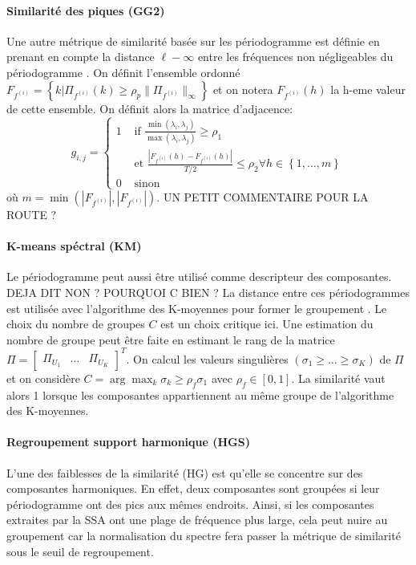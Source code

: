 \documentclass{gretsi}
\newcommand{\val}[3]{(#1_1 #3 \dots #3 #1_#2)}
\newcommand{\set}[1]{\left \{ 1, \dots, #1 \right \}}
\newcommand{\inter}{\left[0, 1\right]}
\begin{document}
\paragraph{Similarité des piques (GG2)}\label{par:GG2}
    Une autre métrique de similarité basée sur les périodogramme est définie en prenant en compte la distance $\ell-\infty$ entre les fréquences non négligeables du périodogramme \cite{abalov_14_auto}. On définit l'ensemble ordonné $F_{f^{(i)}} = \left \{ k | \Pi_{f^{(i)}}(k) \ge \rho_p \|\Pi_{f^{(i)}}\|_\infty \right \}$ et on notera $F_{f^{(i)}}(h)$ la h-eme valeur de cette ensemble. On définit alors la matrice d'adjacence:
    $$
    g_{i, j} = \begin{cases}
	    1 & \text{ if } \displaystyle\frac{\min(\lambda_i, \lambda_j)}{\max(\lambda_i, \lambda_j)} \ge \rho_1\\
	      & \text{ et } \frac{|F_{f^{(i)}}(h) - F_{f^{(i)}}(h)|}{T/2} \le \rho_2 \forall h \in \set{m}\\
	    0 & \text{ sinon}
    \end{cases}
    $$ où $m = \min\left(\left|F_{f^{(i)}}\right|, \left|F_{f^{(i)}}\right|\right)$.
UN PETIT COMMENTAIRE POUR LA ROUTE ?

\paragraph{K-means spéctral (KM)}\label{par:KM}
    Le périodogramme peut aussi être utilisé comme descripteur des composantes. DEJA DIT NON ? POURQUOI C BIEN ? La distance entre ces périodogrammes est utilisée avec l'algorithme des K-moyennes pour former le groupement \cite{alvarez_13_auto}. Le choix du nombre de groupes $C$ est un choix critique ici. Une estimation du nombre de groupe peut être faite en estimant le rang de la matrice $\Pi = \begin{bmatrix}\Pi_{U_1}&\dots&\Pi_{U_K}\end{bmatrix}^T$. On calcul les valeurs singulières $\val{\sigma}{K}{\ge}$ de $\Pi$ et on considère $C = \arg\max_k \sigma_k \ge \rho_f \sigma_1$ avec $\rho_f \in \inter$. La similarité vaut alors 1 lorsque les composantes appartiennent au même groupe de l'algorithme des K-moyennes.


\paragraph{Regroupement support harmonique (HGS)}\label{par:HGS}
    L'une des faiblesses de la similarité (HG) est qu'elle se concentre sur des composantes harmoniques. En effet, deux composantes sont groupées si leur périodogramme ont des pics aux mêmes endroits. Ainsi, si les composantes extraites par la SSA ont une plage de fréquence plus large, cela peut nuire au groupement car la normalisation du spectre fera passer la métrique de similarité sous le seuil de regroupement.
    
\end{document}
